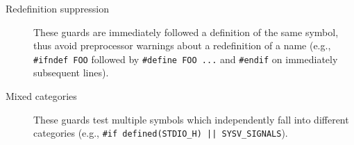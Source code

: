 \begin{description}
\item[Redefinition suppression] These guards are immediately
      followed a definition of the same symbol, thus avoid preprocessor
      warnings about a redefinition of a name (e.g., \texttt{\#ifndef
      FOO} followed by \texttt{\#define FOO ...} and \texttt{\#endif} on
      immediately subsequent lines).

\item[Mixed categories] These guards test multiple symbols
      which independently fall into different categories (e.g.,
      {\tt \#if defined(\verb|STDIO_H|) || \verb|SYSV_SIGNALS|}).

\end{description}

